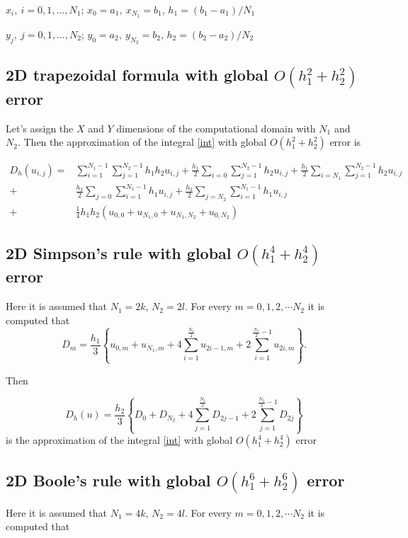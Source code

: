 \documentclass[%
 aip,
cp,  %
 amsmath,amssymb,%
 reprint,%
]{revtex4-2}
\begin{document}
$x_i, ~i=0,1,...,N_1$; $x_0=a_1,~x_{N_1}=b_1$, $h_1=(b_1-a_1)/N_1$


$y_j, ~j=0,1,...,N_2$; $y_0=a_2,~y_{N_2}=b_2$,  $h_2=(b_2-a_2)/N_2$

\subsection{ 2D trapezoidal formula with global $O(h_1^2+h_2^2)$ error }

Let's assign the $X$ and $Y$ dimensions of the computational domain with $N_1$ and $N_2$. Then the approximation of the integral \eqref{int} 
with global $O(h_1^2+h_2^2)$ error is

\begin{align}\label{quadr2}
D_h(u_{i,j}) =& \sum_{i=1}^{N_1-1} \sum_{j=1}^{N_2-1} h_1 h_2 u_{i,j}
+\frac{h_1}{2}\sum_{i=0} \sum_{j=1}^{N_2-1} h_2 u_{i,j}
+\frac{h_1}{2}\sum_{i=N_1} \sum_{j=1}^{N_2-1} h_2 u_{i,j} \nonumber\\
+&\frac{h_2}{2}\sum_{j=0} \sum_{i=1}^{N_1-1} h_1 u_{i,j}
+\frac{h_2}{2}\sum_{j=N_2} \sum_{i=1}^{N_1-1} h_1 u_{i,j}
\nonumber\\
+&\frac{1}{4}h_1 h_2 \left(u_{0,0}+u_{N_1,0}+u_{N_1,N_2}+u_{0,N_2}
\right)
\end{align}

\subsection{ 2D Simpson's rule with global $O(h_1^4+h_2^4)$ error}

Here it is assumed that $N_1=2k$, $N_2=2 l$. For every $m=0,1,2,\cdots N_2$ it is computed that 
$$D_m= \frac{h_1 }{3} 
\left\{ u_{0,m}+u_{N_1,m}+ 4 \sum_{i=1}^{\frac{N_1}{2}}   u_{2i-1,m}
 +2 \sum_{i=1}^{\frac{N_1}{2}-1} u_{2i,m} \right\}.$$


Then 

\begin{equation}\label{quadr4}
D_h(u)=\frac{h_2 }{3} 
\left\{ D_{0}+D_{N_2}+ 4 \sum_{j=1}^{\frac{N_2}{2}}   D_{2j-1}
 +2 \sum_{j=1}^{{\frac{N_2}{2}}-1} D_{2j} \right\}
\end{equation}
is the approximation of the integral \eqref{int} with global $O(h_1^4+h_2^4)$ error


\subsection{ 2D Boole's rule with global $O(h_1^6+h_2^6)$ error }
Here it is assumed that $N_1=4k$, $N_2=4 l$. For every $m=0,1,2,\cdots N_2$ it is computed that
\end{document}
